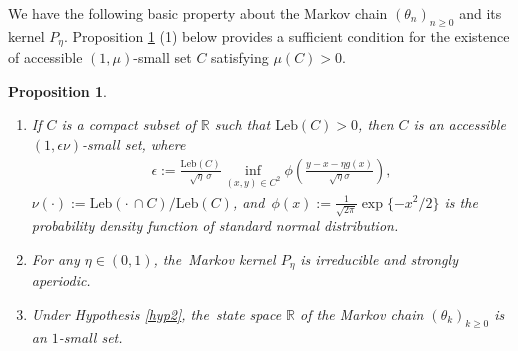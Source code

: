 \documentclass[11pt]{elsarticle}
\newtheorem{proposition}{Proposition}[section]
\def\geq{\geqslant}
\begin{document}
We have the following basic property about the Markov chain $(\theta_n)_{n\geq0}$ and its kernel $P_{\eta}$. Proposition \ref{aperiodic} (1) below provides a sufficient condition for the existence of accessible $(1,\mu)$-small set $C$ satisfying $\mu(C)>0$.
\begin{proposition}\label{aperiodic}
	\begin{enumerate}
		\item[(1)] If $C$ is a compact subset of $\mathbb{R}$ such that $\mbox{Leb}(C)>0$,  then $C$ is an accessible $(1,\epsilon\nu)$-small set, where
		\begin{align}\label{Def-eps}
			\epsilon:=\frac{\mbox{Leb}(C)}{\sqrt{\eta}\,\sigma}\inf_{(x,y)\in C^2}\phi\left(\frac{y-x-\eta g(x)}{\sqrt{\eta}\sigma}\right),
		\end{align}
		$\nu(\cdot):=\mbox{Leb}(\cdot\,\cap C)/\mbox{Leb}(C)$, and~$\phi(x):=\frac{1}{\sqrt{2\pi}}\exp\{-x^2/2\}$ is the probability density function of standard normal distribution.
		\item[(2)] For any $\eta\in(0,1)$, the~Markov kernel $P_{\eta}$ is irreducible and strongly aperiodic.
		\item[(3)] Under Hypothesis \ref{hyp2}, the~state space $\mathbb{R}$ of the Markov chain $(\theta_k)_{k\geq0}$ is an $1$-small set.
	\end{enumerate}
\end{proposition}
\end{document}
